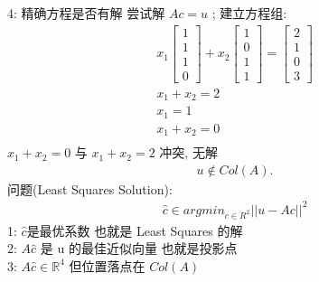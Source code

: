 \documentclass[12pt]{article}
\begin{document}
\begin{flushleft}
    4: 精确方程是否有解
    尝试解 $Ac = u$ ;
    建立方程组: \\
    \begin{align}
        x_1 \begin{bmatrix}
                1 \\
                1 \\
                1 \\
                0
            \end{bmatrix} + x_2 \begin{bmatrix}
                                    1 \\
                                    0 \\
                                    1 \\
                                    1
                                \end{bmatrix} = \begin{bmatrix}
                                                    2 \\
                                                    1 \\
                                                    0 \\
                                                    3
                                                \end{bmatrix} \\
        x_{1} + x_2 = 2                                        \\
        x_{1} = 1                                              \\
        x_{1} + x_{2} = 0                                      \\
    \end{align}
    $x_{1} + x_{2} = 0$ 与 $x_{1} + x_2 = 2$ 冲突, 无解 \\
    \begin{align}
        u \notin Col(A).
    \end{align}
    问题(Least Squares Solution): \\
    \begin{align}
        \hat{c} \in arg min_{c \in R^{2}} ||u - Ac||^{2}
    \end{align}
    1: $\hat{c}$是最优系数 也就是 Least Squares 的解 \\
    2: $A\hat{c}$ 是 u 的最佳近似向量 也就是投影点 \\
    3: $A\hat{c} \in \mathbb{R}^{4}$ 但位置落点在 $Col(A)$ \\


\end{flushleft}
\end{document}

